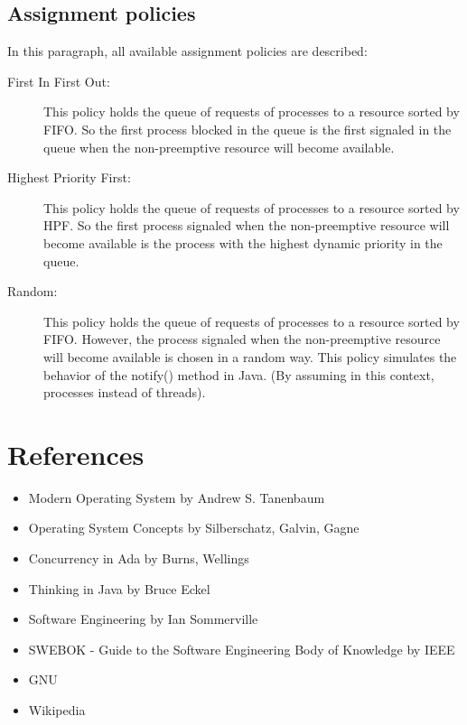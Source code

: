 \documentclass[10pt,a4paper,twoside,titlepage]{article}
\begin{document}
\subsection{Assignment policies}
\label{subsec:Assignment policies}
In this paragraph, all available assignment policies are described:
\begin{description}
 \item[First In First Out:] This policy holds the queue of requests of processes to a resource sorted by FIFO. So the first process blocked in the queue is the first signaled in the queue when the non-preemptive resource will become available. 
 \item[Highest Priority First:] This policy holds the queue of requests of processes to a resource sorted by HPF. So the first process signaled when the non-preemptive resource will become available is the process with the highest dynamic priority in the queue. 
 \item[Random:] This policy holds the queue of requests of processes to a resource sorted by FIFO. However, the process signaled when the non-preemptive resource will become available is chosen in a random way. This policy simulates the behavior of the notify() method in Java. (By assuming in this context, processes instead of threads).
\end{description}


\clearpage
\section*{References}
\label{sec:References}
\begin{itemize}
 \item Modern Operating System by Andrew S. Tanenbaum 
 \item Operating System Concepts by Silberschatz, Galvin, Gagne 
 \item Concurrency in Ada by Burns, Wellings 
 \item Thinking in Java by Bruce Eckel 
 \item Software Engineering by Ian Sommerville 
 \item SWEBOK - Guide to the Software Engineering Body of Knowledge by IEEE 
 \item GNU
 \item Wikipedia 
\end{itemize}
\end{document}
